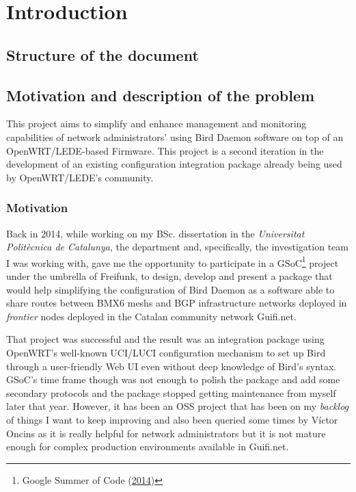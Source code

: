 \chapter{Introduction}
\label{ch:introduction}
\pagestyle{headings}

\section{Structure of the document}

\section{Motivation and description of the problem}
\label{sec:bdotp}
This project aims to simplify and enhance management and monitoring capabilities of network administrators' using Bird Daemon software on top of an OpenWRT/LEDE-based Firmware. This project is a second iteration in the development of an existing configuration integration package already being used by OpenWRT/LEDE's community.

\subsection{Motivation}
Back in 2014, while working on my BSc. dissertation in the \textit{Universitat Politècnica de Catalunya}, the department and, specifically, the investigation team I was working with, gave me the opportunity to participate in a GSoC\footnote{Google Summer of Code (\href{https://www.google-melange.com/archive/gsoc/2014/orgs/freifunk/projects/eloicaso.html}{2014})} project under the umbrella of Freifunk, to design, develop and present  a package that would help simplifying the configuration of Bird Daemon as a software able to share routes between BMX6 meshs and BGP infrastructure networks deployed in \textit{frontier} nodes deployed in the Catalan community network Guifi.net.

That project was successful and the result was an integration package using OpenWRT's well-known UCI/LUCI configuration mechanism to set up Bird through a user-friendly Web UI even without deep knowledge of Bird's syntax. GSoC's time frame though was not enough to polish the package and add some secondary protocols and the package stopped getting maintenance from myself later that year. However, it has been an OSS project that has been on my \textit{backlog} of things I want to keep improving and also been queried some times by Víctor Oncins as it is really helpful for network administrators but it is not mature enough for complex production environments available in Guifi.net.

